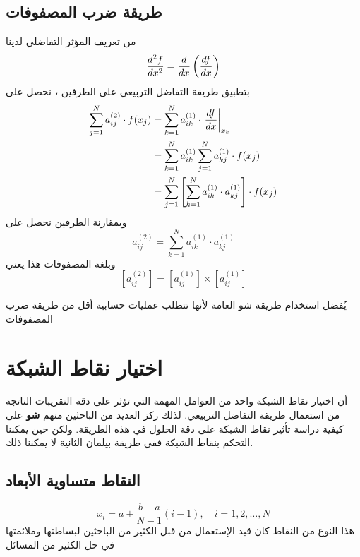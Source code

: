 \subsection[طريقة ضرب المصفوفات]{طريقة ضرب المصفوفات \cite{chang_shu} }
من تعريف المؤثر التفاضلي لدينا
\[
\frac{d^2f}{dx^2}=\frac{d}{dx}\left(\frac{df}{dx}\right)
\]
بتطبيق طريقة التفاضل التربيعي على الطرفين ، نحصل على
\begin{align*}
	\sum_{j=1}^{N}a_{ij}^{(2)}\cdot f(x_j)&=\sum_{k=1}^{N}a_{ik}^{(1)}\cdot \left.\frac{df}{dx}\right|_{x_k}\\
	&=\sum_{k=1}^{N}a_{ik}^{(1)}\sum_{j=1}^{N}a_{kj}^{(1)}\cdot f(x_j)\\
	&=\sum_{j=1}^{N}\left[\sum_{k=1}^{N}a_{ik}^{(1)}\cdot a_{kj}^{(1)}\right]\cdot f(x_j)
\end{align*}
وبمقارنة الطرفين نحصل على
\begin{equation}
	a_{ij}^{(2)}=\sum_{k=1}^{N}a_{ik}^{(1)}\cdot a_{kj}^{(1)}
\end{equation}
وبلغة المصفوفات هذا يعني
\begin{equation}
	\label{second_order_equations}
	[a_{ij}^{(2)}]=[a_{ij}^{(1)}]\times[a_{ij}^{(1)}]
\end{equation}

\begin{note}
	يُفضل استخدام طريقة شو العامة لأنها تتطلب عمليات حسابية أقل من طريقة ضرب المصفوفات
\end{note}

\section[اختيار نقاط الشبكة]{اختيار نقاط الشبكة }

أن اختيار نقاط الشبكة واحد من العوامل المهمة التي تؤثر على دقة التقريبات الناتجة من استعمال طريقة التفاضل التربيعي. لذلك ركز العديد من الباحثين منهم \textbf{شو } على كيفية دراسة تأثير نقاط الشبكة على دقة الحلول في هذه الطريقة. ولكن حين يمكننا التحكم بنقاط الشبكة ففي طريقة بيلمان الثانية لا يمكننا ذلك.

\subsection[النقاط متساوية الأبعاد]{النقاط متساوية الأبعاد }

\begin{equation}
	\label{eq:equally_spaced_points}
	x_i=a+\frac{b-a}{N-1}(i-1),\quad i=1,2,\dots,N
\end{equation}
هذا النوع من النقاط كان قيد الإستعمال من قبل الكثير من الباحثين لبساطتها وملائمتها في حل الكثير من المسائل

